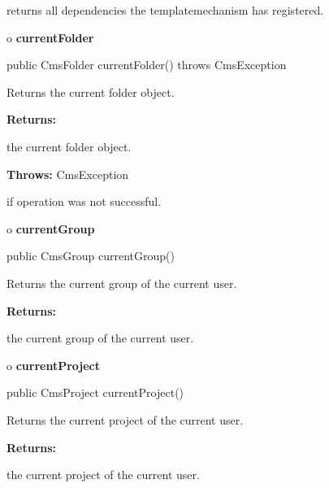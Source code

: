 \begin{description}
\htmlDD returns all dependencies the templatemechanism has registered. 

\end{description}

o {\bf currentFolder} 

\begin{PRE}
 public CmsFolder currentFolder() throws CmsException
\end{PRE}

\begin{description}
\htmlDD Returns the current folder object. 

\begin{description}
\item {\bf Returns:}  

the current folder object.  
\item {\bf Throws:} CmsException  

if operation was not successful.  
\end{description}

\end{description}

o {\bf currentGroup} 

\begin{PRE}
 public CmsGroup currentGroup()
\end{PRE}

\begin{description}
\htmlDD Returns the current group of the current user. 

\begin{description}
\item {\bf Returns:}  

the current group of the current user.  
\end{description}

\end{description}

o {\bf currentProject} 

\begin{PRE}
 public CmsProject currentProject()
\end{PRE}

\begin{description}
\htmlDD Returns the current project of the current user. 

\begin{description}
\item {\bf Returns:}  

the current project of the current user.  
\end{description}

\end{description}

